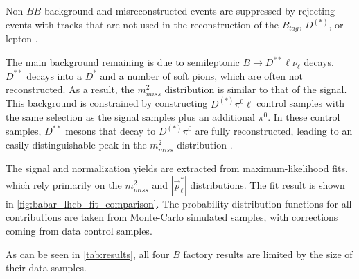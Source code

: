 Non-$B \overline{B}$ background and misreconstructed events are suppressed by
rejecting events with tracks that are not used in the reconstruction of the
$B_{tag}$, $D^{(*)}$, or lepton \cite{Ciezarek:2017yzh}.

The main background remaining is due to semileptonic $B \rightarrow D^{**} \ell
\bar{\nu}_\ell$ decays.
$D^{**}$ decays into a $D^{*}$ and a number of soft pions, which are often not
reconstructed.
As a result, the $m^2_{miss}$ distribution is similar to that of the signal.
This background is constrained by constructing $D^{(*)}\pi^0\ell$ control
samples with the same selection as the signal samples plus an additional
$\pi^0$.
In these control samples, $D^{**}$ mesons that decay to $D^{(*)} \pi^0$ are
fully reconstructed, leading to an easily distinguishable peak in the
$m^2_{miss}$ distribution \cite{Lees:2013uzd}.

The signal and normalization yields are extracted from maximum-likelihood fits,
which rely primarily on the $m^2_{miss}$ and $|\vec{p}^*_\ell|$ distributions.
The fit result is shown in \autoref{fig:babar_lhcb_fit_comparison}.
The probability distribution functions for all contributions are taken from
Monte-Carlo simulated samples, with corrections coming from data control
samples.

As can be seen in \autoref{tab:results}, all four $B$ factory results are
limited by the size of their data samples.
